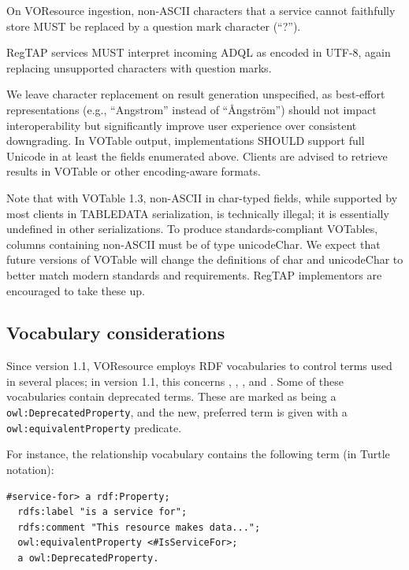 \documentclass[11pt,a4paper]{ivoa}
\begin{document}
On VOResource ingestion, non-ASCII characters that a service cannot
faithfully store MUST be replaced by a question mark character (``?'').

RegTAP services MUST interpret incoming ADQL as encoded in UTF-8,
again replacing unsupported characters with question marks.

We leave character replacement on result generation unspecified, as
best-effort representations (e.g., ``Angstrom'' instead of ``Ångström'')
should not impact interoperability but significantly improve user
experience over consistent downgrading.  In VOTable output,
implementations SHOULD support full Unicode in at least the fields
enumerated above.  Clients are advised to retrieve results in VOTable or
other encoding-aware formats.

Note that with VOTable 1.3, non-ASCII in char-typed fields, while
supported by most clients in TABLEDATA serialization, is technically
illegal; it is essentially undefined in other serializations.  To
produce standards-compliant VOTables, columns containing non-ASCII must
be of type unicodeChar.  We expect that future versions of VOTable will
change the definitions of char and unicodeChar to better match modern
standards and requirements.  RegTAP implementors are encouraged to take
these up.

\subsection{Vocabulary considerations}

\label{sect:vocab-use}

Since version 1.1, VOResource employs RDF vocabularies to control terms
used in several places; in version 1.1, this concerns
, ,
, and .
Some of these vocabularies contain deprecated terms.  These are marked
as being a \texttt{owl:DeprecatedProperty}, and the new, preferred term
is given with a \texttt{owl:equivalentProperty} predicate.

For instance, the relationship vocabulary contains the following term
(in Turtle notation):

\begin{verbatim}
#service-for> a rdf:Property;
  rdfs:label "is a service for";
  rdfs:comment "This resource makes data...";
  owl:equivalentProperty <#IsServiceFor>;
  a owl:DeprecatedProperty.
\end{verbatim}
\end{document}
